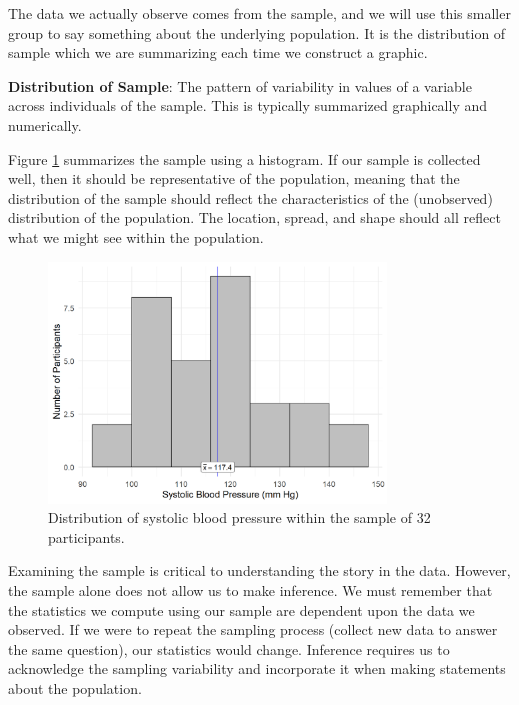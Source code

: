 \documentclass[
]{book}
\theoremstyle{plain}
\theoremstyle{mydefn}
\theoremstyle{myexmpl}
\theoremstyle{remark}
\begin{document}
The data we actually observe comes from the sample, and we will use this smaller group to say something about the underlying population. It is the distribution of sample which we are summarizing each time we construct a graphic.

\begin{rmdfivefund}
\textbf{Distribution of Sample}: The pattern of variability in values of a variable across individuals of the sample. This is typically summarized graphically and numerically.
\end{rmdfivefund}

Figure \ref{fig:distributional-quartet-sample} summarizes the sample using a histogram. If our sample is collected well, then it should be representative of the population, meaning that the distribution of the sample should reflect the characteristics of the (unobserved) distribution of the population. The location, spread, and shape should all reflect what we might see within the population.

\begin{figure}

{\centering \includegraphics[width=0.8\textwidth]{./Images/distributional-quartet-sample-1} 

}

\caption{Distribution of systolic blood pressure within the sample of 32 participants.}\label{fig:distributional-quartet-sample}
\end{figure}

Examining the sample is critical to understanding the story in the data. However, the sample alone does not allow us to make inference. We must remember that the statistics we compute using our sample are dependent upon the data we observed. If we were to repeat the sampling process (collect new data to answer the same question), our statistics would change. Inference requires us to acknowledge the sampling variability and incorporate it when making statements about the population.
\end{document}
